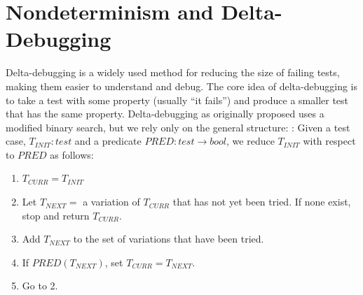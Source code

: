 \section{Nondeterminism and Delta-Debugging}

Delta-debugging \cite{DD}  is a widely used method for reducing the
size of failing tests, making them easier to understand and debug.
The core idea of delta-debugging is to take a test with some
property (usually ``it fails'')
and produce a smaller test that has the same property.
Delta-debugging as originally proposed uses a
modified binary search, but we rely only on the general structure: \cite{CReduce,onetest}:  Given a
test case, $T_{\mathit{INIT}} : \mathit{test}$ and a predicate
$\mathit{PRED}: \mathit{test} \rightarrow \mathit{bool}$, we
reduce $T_{\mathit{INIT}}$ with respect to $\mathit{PRED}$
as follows:

\begin{enumerate}
\item $T_{\mathit{CURR}} = T_{\mathit{INIT}}$
\item Let $T_{\mathit{NEXT}} =$ a variation of $T_{\mathit{CURR}}$
  that has not yet been tried.  If none exist, stop and return $T_{\mathit{CURR}}$.
\item Add $T_{\mathit{NEXT}}$ to the set of variations that have been
  tried.
\item If $\mathit{PRED}(T_{\mathit{NEXT}})$, set $T_{\mathit{CURR}} =
  T_{\mathit{NEXT}}$.
\item Go to 2.
\end{enumerate}


